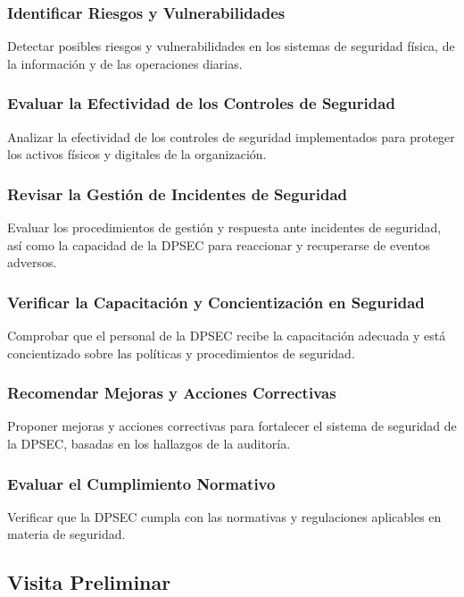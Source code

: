 \documentclass[12pt,a4paper]{article}
\begin{document}
\subsubsection*{Identificar Riesgos y Vulnerabilidades} Detectar posibles riesgos y vulnerabilidades en los sistemas de seguridad física, de la información y de las operaciones diarias.

\subsubsection*{Evaluar la Efectividad de los Controles de Seguridad} Analizar la efectividad de los controles de seguridad implementados para proteger los activos físicos y digitales de la organización.

\subsubsection*{Revisar la Gestión de Incidentes de Seguridad} Evaluar los procedimientos de gestión y respuesta ante incidentes de seguridad, así como la capacidad de la DPSEC para reaccionar y recuperarse de eventos adversos.

\subsubsection*{Verificar la Capacitación y Concientización en Seguridad} Comprobar que el personal de la DPSEC recibe la capacitación adecuada y está concientizado sobre las políticas y procedimientos de seguridad.

\subsubsection*{Recomendar Mejoras y Acciones Correctivas} Proponer mejoras y acciones correctivas para fortalecer el sistema de seguridad de la DPSEC, basadas en los hallazgos de la auditoría.

\subsubsection*{Evaluar el Cumplimiento Normativo} Verificar que la DPSEC cumpla con las normativas y regulaciones aplicables en materia de seguridad.

\newpage
\subsection{Visita Preliminar}
\end{document}

